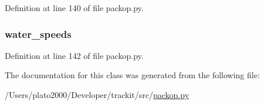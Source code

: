Definition at line 140 of file packop.\+py.

\subsubsection[{\texorpdfstring{water\+\_\+speeds}{water_speeds}}]{\setlength{\rightskip}{0pt plus 5cm}water\+\_\+speeds}\hypertarget{classsrc_1_1packop_1_1_package_a4fd9fe5f73cb34aa5b5c7029f024d4f6}{}\label{classsrc_1_1packop_1_1_package_a4fd9fe5f73cb34aa5b5c7029f024d4f6}


Definition at line 142 of file packop.\+py.



The documentation for this class was generated from the following file\+:\begin{DoxyCompactItemize}
\item 
/\+Users/plato2000/\+Developer/trackit/src/\hyperlink{packop_8py}{packop.\+py}\end{DoxyCompactItemize}
